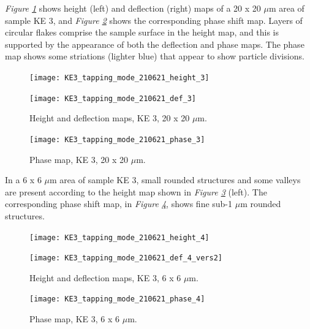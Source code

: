 \textit{Figure \ref{fig:afm_ke3_height_def_4}} shows height (left) and deflection (right) maps of a 20 x 20 $\mu$m area of sample KE 3, and \textit{Figure \ref{fig:afm_ke3_phase_4}} shows the corresponding phase shift map. Layers of circular flakes comprise the sample surface in the height map, and this is supported by the appearance of both the deflection and phase maps. The phase map shows some striations (lighter blue) that appear to show particle divisions.


\begin{figure}[H]
\centering
\begin{minipage}{.45\textwidth}
  \centering
  \texttt{[image: KE3\_tapping\_mode\_210621\_height\_3]}
\end{minipage}
\begin{minipage}{.45\textwidth}
  \centering
  \texttt{[image: KE3\_tapping\_mode\_210621\_def\_3]}
\end{minipage}
\caption[Height and deflection maps, KE 3]{Height and deflection maps, KE 3, 20 x 20 $\mu$m.}
\label{fig:afm_ke3_height_def_4}
\end{figure}

\begin{figure}[H]
\centering
  \texttt{[image: KE3\_tapping\_mode\_210621\_phase\_3]}
\caption[Phase map, KE 3]{Phase map, KE 3, 20 x 20 $\mu$m.}
\label{fig:afm_ke3_phase_4}
\end{figure}

In a 6 x 6 $\mu$m area of sample KE 3, small rounded structures and some valleys are present according to the height map shown in \textit{Figure \ref{fig:afm_ke3_height_def_5}} (left). The corresponding phase shift map, in \textit{Figure \ref{fig:afm_ke3_phase_5}}, shows fine sub-1 $\mu$m rounded structures.

\begin{figure}[H]
\centering
\begin{minipage}{.45\textwidth}
  \centering
  \texttt{[image: KE3\_tapping\_mode\_210621\_height\_4]}
\end{minipage}
\begin{minipage}{.45\textwidth}
  \centering
  \texttt{[image: KE3\_tapping\_mode\_210621\_def\_4\_vers2]}
\end{minipage}
\caption[Height and deflection maps, KE 3]{Height and deflection maps, KE 3, 6 x 6 $\mu$m.}
\label{fig:afm_ke3_height_def_5}
\end{figure}

\begin{figure}[H]
\centering
  \texttt{[image: KE3\_tapping\_mode\_210621\_phase\_4]}
\caption[Phase map, KE 3]{Phase map, KE 3, 6 x 6 $\mu$m.}
\label{fig:afm_ke3_phase_5}
\end{figure}



